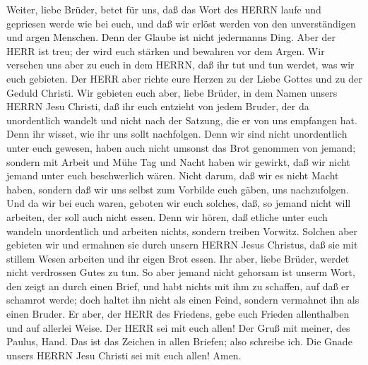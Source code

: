  Weiter, liebe Brüder, betet für uns, daß das Wort des HERRN
laufe und gepriesen werde wie bei euch,  und daß wir erlöst
werden von den unverständigen und argen Menschen. Denn der Glaube ist
nicht jedermanns Ding.  Aber der HERR ist treu; der wird
euch stärken und bewahren vor dem Argen.  Wir versehen uns
aber zu euch in dem HERRN, daß ihr tut und tun werdet, was wir euch
gebieten.  Der HERR aber richte eure Herzen zu der Liebe
Gottes und zu der Geduld Christi.  Wir gebieten euch aber,
liebe Brüder, in dem Namen unsers HERRN Jesu Christi, daß ihr euch
entzieht von jedem Bruder, der da unordentlich wandelt und nicht nach
der Satzung, die er von uns empfangen hat.  Denn ihr wisset,
wie ihr uns sollt nachfolgen. Denn wir sind nicht unordentlich unter
euch gewesen,  haben auch nicht umsonst das Brot genommen
von jemand; sondern mit Arbeit und Mühe Tag und Nacht haben wir gewirkt,
daß wir nicht jemand unter euch beschwerlich wären.  Nicht
darum, daß wir es nicht Macht haben, sondern daß wir uns selbst zum
Vorbilde euch gäben, uns nachzufolgen.  Und da wir bei euch
waren, geboten wir euch solches, daß, so jemand nicht will arbeiten, der
soll auch nicht essen.  Denn wir hören, daß etliche unter
euch wandeln unordentlich und arbeiten nichts, sondern treiben Vorwitz.
 Solchen aber gebieten wir und ermahnen sie durch unsern
HERRN Jesus Christus, daß sie mit stillem Wesen arbeiten und ihr eigen
Brot essen.  Ihr aber, liebe Brüder, werdet nicht
verdrossen Gutes zu tun.  So aber jemand nicht gehorsam ist
unserm Wort, den zeigt an durch einen Brief, und habt nichts mit ihm zu
schaffen, auf daß er schamrot werde;  doch haltet ihn nicht
als einen Feind, sondern vermahnet ihn als einen Bruder. 
Er aber, der HERR des Friedens, gebe euch Frieden allenthalben und auf
allerlei Weise. Der HERR sei mit euch allen!  Der Gruß mit
meiner, des Paulus, Hand. Das ist das Zeichen in allen Briefen; also
schreibe ich.  Die Gnade unsers HERRN Jesu Christi sei mit
euch allen! Amen.
